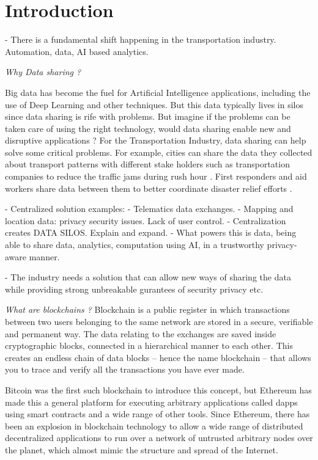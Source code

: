 \section{Introduction}\label{sec:intro}

- There is a fundamental shift happening in the transportation industry. Automation, data, AI based analytics.

{\em Why Data sharing ?}

Big data has become the fuel for Artificial Intelligence applications, including the use of Deep Learning and other
techniques. But this data typically lives in silos since data sharing is rife with problems. But imagine if the problems
can be taken care of using the right technology, would data sharing enable new and disruptive applications ? For the
Transportation Industry, data sharing can help solve some critical problems.  For example, cities can share the data
they collected about transport patterns with different stake holders such as transportation companies to reduce the
traffic jams during rush hour \cite{traffic_jam}. First responders and aid workers share data between them to better
coordinate disaster relief efforts \cite{bharosa_2010}.

- Centralized solution examples:
    - Telematics data exchanges.
    - Mapping and location data: privacy security issues. Lack of user control.
    - Centralization creates DATA SILOS. Explain and expand.
- What powers this is data, being able to share data, analytics, computation using AI, in a trustworthy privacy-aware
manner.

- The industry needs a solution that can allow new ways of sharing the data while providing strong unbreakable gurantees
of security privacy etc.

{\em What are blockchains ?}
Blockchain is a public register in which transactions between two users belonging to the same network are stored in a secure, verifiable
and permanent way. The data relating to the exchanges are saved inside cryptographic blocks, connected in a hierarchical
manner to each other. This creates an endless chain of data blocks -- hence the name blockchain -- that allows you to
trace and verify all the transactions you have ever made.

Bitcoin was the first such blockchain to introduce this concept, but Ethereum has made this a general platform for
executing arbitrary applications called dapps using smart contracts and a wide range of other tools. Since Ethereum,
there has been an explosion in blockchain technology to allow a wide range of distributed decentralized applications to
run over a network of untrusted arbitrary nodes over the planet, which almost mimic the structure and spread of the
Internet.

